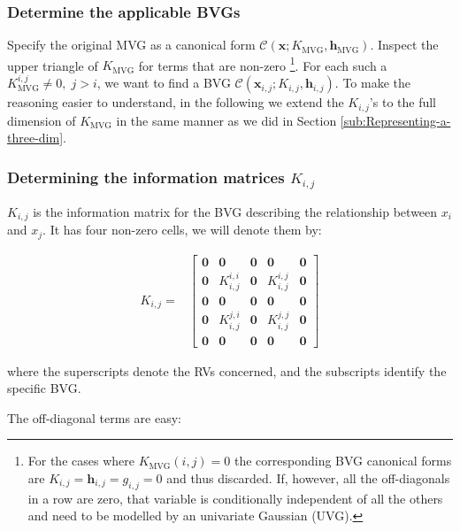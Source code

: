 \subsubsection{Determine the applicable BVGs }

Specify the original MVG as a canonical form $\mathcal{C}(\mathbf{x};K_{\mbox{MVG}},\mathbf{h}_{\mbox{MVG}})$.
Inspect the upper triangle of $K_{\mbox{MVG}}$ for terms that are
non-zero%
\footnote{For the cases where $K_{\mbox{MVG}}(i,j)=0$ the corresponding BVG
canonical forms are $K_{i,j}=\mathbf{h}_{i,j}=g_{i,j}=0$ and thus
discarded. If, however, all the off-diagonals in a row are zero, that
variable is conditionally independent of all the others and need to
be modelled by an univariate Gaussian (UVG).%
}. For each such a $K_{\mbox{MVG}}^{i,j}\neq0,\; j>i$, we want to
find a BVG $\mathcal{C}(\mathbf{x}_{i,j};K_{i,j},\mathbf{h}_{i,j})$.
To make the reasoning easier to understand, in the following we extend
the $K_{i,j}$'s to the full dimension of $K_{\mbox{MVG}}$ in the
same manner as we did in Section \ref{sub:Representing-a-three-dim}.


\subsubsection{Determining the information matrices $K_{i,j}$}

$K_{i,j}$ is the information matrix for the BVG describing the relationship
between $x_{i}$ and $x_{j}$. It has four non-zero cells, we will
denote them by:

\begin{align*}
K_{i,j}= & \left[\begin{array}{ccccc}
\mathbf{0} & \mathbf{0} & \mathbf{\mathbf{0}} & \mathbf{0} & \mathbf{0}\\
\mathbf{0} & K_{i,j}^{i,i} & \mathbf{0} & K_{i,j}^{i,j} & \mathbf{0}\\
\mathbf{0} & \mathbf{0} & \mathbf{0} & \mathbf{0} & \mathbf{0}\\
\mathbf{0} & K_{i,j}^{j,i} & \mathbf{0} & K_{i,j}^{j,j} & \mathbf{0}\\
\mathbf{0} & \mathbf{0} & \mathbf{0} & \mathbf{0} & \mathbf{0}
\end{array}\right]
\end{align*}


where the superscripts denote the RVs concerned, and the subscripts
identify the specific BVG.

The off-diagonal terms are easy:

